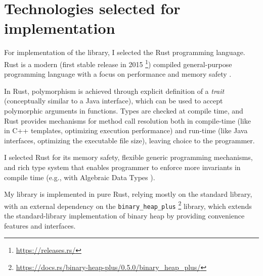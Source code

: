 \section{Technologies selected for implementation}

For implementation of the library, I selected the Rust programming language. Rust is a modern
(first stable release in 2015 \footnote{\url{https://releases.rs/}})
compiled general-purpose programming language with a focus on performance and memory safety
\cite{klabnik2023rust}.

In Rust, polymorphism is achieved through explicit definition of a
\emph{trait} \cite{klabnik2023rust} (conceptually similar to a Java interface),
which can be used to accept polymorphic arguments in functions.
Types are checked at compile time, and Rust provides mechanisms for method call
resolution both in compile-time (like in C++ templates, optimizing execution performance)
and run-time (like Java interfaces, optimizing the executable file size),
leaving choice to the programmer.

I selected Rust for its memory safety, flexible generic programming mechanisms, and rich
type system that enables programmer to enforce more invariants in compile time (e.g., with
Algebraic Data Types \cite{klabnik2023rust}).

My library is implemented in pure Rust, relying mostly on the standard library, with an
external dependency on the \texttt{binary\_heap\_plus}
\footnote{\url{https://docs.rs/binary-heap-plus/0.5.0/binary_heap_plus/}} library,
which extends the standard-library implementation of binary heap by providing convenience
features and interfaces.



